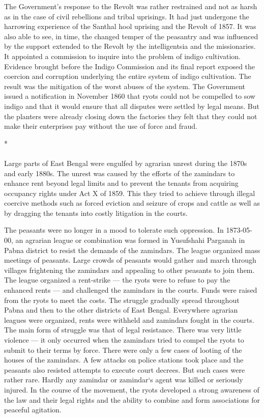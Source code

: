 \begin{multicols}{2}
The Government's response to the Revolt was rather restrained and not as harsh as in the case of civil rebellions and tribal uprisings. It had just undergone the harrowing experience of the Santhal hool uprising and the Revolt of 1857. It was also able to see, in time, the changed temper of the peasantry and was influenced by the support extended to the Revolt by the intelligentsia and the missionaries. It appointed a commission to inquire into the problem of indigo cultivation. Evidence brought before the Indigo Commission and its final report exposed the coercion and corruption underlying the entire system of indigo cultivation. The result was the mitigation of the worst abuses of the system. The Government issued a notification in November 1860 that ryots could not be compelled to sow indigo and that it would ensure that all disputes were settled by legal means. But the planters were already closing down the factories they felt that they could not make their enterprises pay without the use of force and fraud.

\begin{center}*\end{center}

\paragraph*{}
Large parts of East Bengal were engulfed by agrarian unrest during the 1870s and early 1880s. The unrest was caused by the efforts of the zamindars to enhance rent beyond legal limits and to prevent the tenants from acquiring occupancy rights under Act X of 1859. This they tried to achieve through illegal coercive methods such as forced eviction and seizure of crops and cattle as well as by dragging the tenants into costly litigation in the courts.

The peasants were no longer in a mood to tolerate such oppression. In 1873-05-00, an agrarian league or combination was formed in Yusufshahi Parganah in Pabna district to resist the demands of the zamindars. The league organized mass meetings of peasants. Large crowds of peasants would gather and march through villages frightening the zamindars and appealing to other peasants to join them. The league organized a rent-strike --- the ryots were to refuse to pay the enhanced rents --- and challenged the zamindars in the courts. Funds were raised from the ryots to meet the costs. The struggle gradually spread throughout Pabna and then to the other districts of East Bengal. Everywhere agrarian leagues were organized, rents were withheld and zamindars fought in the courts. The main form of struggle was that of legal resistance. There was very little violence --- it only occurred when the zamindars tried to compel the ryots to submit to their terms by force. There were only a few cases of looting of the houses of the zamindars. A few attacks on police stations took place and the peasants also resisted attempts to execute court decrees. But such cases were rather rare. Hardly any zamindar or zamindar`s agent was killed or seriously injured. In the course of the movement, the ryots developed a strong awareness of the law and their legal rights and the ability to combine and form associations for peaceful agitation.


\end{multicols}

